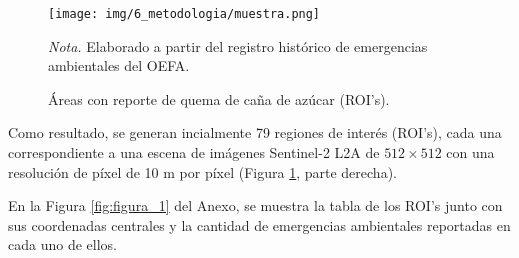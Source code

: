 \begin{figure}[H]
    \centering
    \caption{Áreas con reporte de quema de caña de azúcar (ROI's).}
    \texttt{[image: img/6\_metodologia/muestra.png]}
    \label{fig:muestra}
    \begin{flushleft}
        \vspace{-\baselineskip}
        \textit{Nota.} Elaborado a partir del registro histórico de emergencias ambientales del OEFA.        
        \vspace{-\baselineskip}
    \end{flushleft}
\end{figure}


Como resultado, se generan incialmente 79 regiones de interés (ROI's), cada una correspondiente a una escena de imágenes Sentinel-2 L2A de $512 
\times 512$ con una resolución de píxel de 10 m por píxel (Figura \ref{fig:muestra}, parte derecha). 

En la Figura \ref{fig:figura_1} del Anexo, se muestra la tabla de los ROI's junto con sus coordenadas centrales y la cantidad de emergencias ambientales reportadas en cada uno de ellos.

    